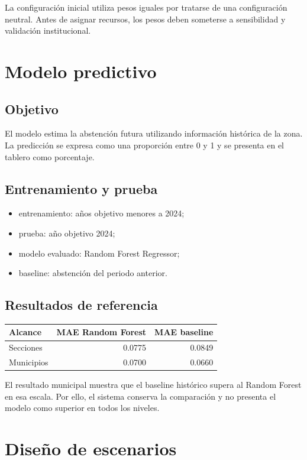 \documentclass[11pt,a4paper]{article}
\begin{document}
La configuración inicial utiliza pesos iguales por tratarse de una configuración neutral. Antes de asignar recursos, los pesos deben someterse a sensibilidad y validación institucional.

\section{Modelo predictivo}

\subsection{Objetivo}

El modelo estima la abstención futura utilizando información histórica de la zona. La predicción se expresa como una proporción entre 0 y 1 y se presenta en el tablero como porcentaje.

\subsection{Entrenamiento y prueba}

\begin{itemize}
    \item entrenamiento: años objetivo menores a 2024;
    \item prueba: año objetivo 2024;
    \item modelo evaluado: Random Forest Regressor;
    \item baseline: abstención del periodo anterior.
\end{itemize}

\subsection{Resultados de referencia}

\begin{longtable}{p{}rr}
\toprule
\textbf{Alcance} & \textbf{MAE Random Forest} & \textbf{MAE baseline}\\
\midrule
Secciones & 0.0775 & 0.0849\\
Municipios & 0.0700 & 0.0660\\
\bottomrule
\end{longtable}

El resultado municipal muestra que el baseline histórico supera al Random Forest en esa escala. Por ello, el sistema conserva la comparación y no presenta el modelo como superior en todos los niveles.

\section{Diseño de escenarios}
\end{document}
